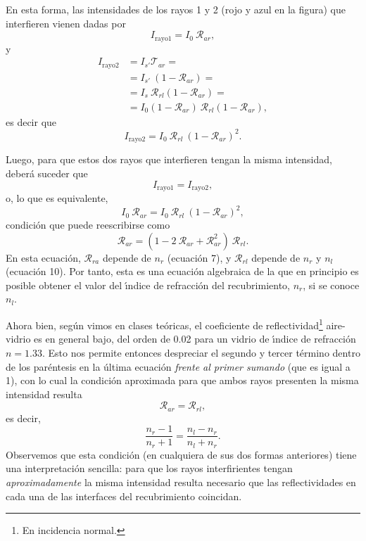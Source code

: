 \documentclass[a4paper]{article}
\begin{document}
En esta forma, las intensidades de los rayos 1 y 2 (rojo y azul en la
figura) que interfieren vienen dadas por
\begin{equation}
    I_\text{rayo1} = I_0 \: \mathcal{R}_{ar},
\end{equation}
y
\begin{align*}
    I_\text{rayo2} &= I_{s'} \mathcal{T}_{ar} = \\
                   &= I_{s'} \: \left(1 - \mathcal{R}_{ar}\right) = \\
                   &= I_s \: \mathcal{R}_{rl} \left(1 - \mathcal{R}_{ar}\right) =  \\
                   &= I_0 \left(1 - \mathcal{R}_{ar}\right) \: \mathcal{R}_{rl} 
\left(1 - \mathcal{R}_{ar}\right),
\end{align*}
es decir que
\begin{equation}
    I_\text{rayo2} = I_0 \: \mathcal{R}_{rl} \: 
    \left( 1 - \mathcal{R}_{ar}\right)^2.
\end{equation}

Luego, para que estos dos rayos que interfieren tengan la misma 
intensidad, deber\'a suceder que
\begin{equation}
    I_\text{rayo1} = I_\text{rayo2},
\end{equation}
o, lo que es equivalente,
\begin{equation*}
    I_0 \: \mathcal{R}_{ar} = I_0 \: \mathcal{R}_{rl} \: \left(
    1 - \mathcal{R}_{ar}        \right)^2,
\end{equation*}
condici\'on que puede reescribirse como
\begin{equation}
    \mathcal{R}_{ar} = \left(1- 2\: \mathcal{R}_{ar} +
    \mathcal{R}_{ar}^2 \right) \: \mathcal{R}_{rl}.
\end{equation}
En esta ecuaci\'on, $\mathcal{R}_{ra}$ depende de $n_r$ (ecuaci\'on
7), y
$\mathcal{R}_{rl}$ depende de $n_r$ y $n_l$ (ecuaci\'on 10). Por tanto,
esta es una ecuaci\'on algebraica de la que en principio es
posible obtener el valor del \'\i ndice de refracci\'on
del recubrimiento, $n_r$, si se conoce $n_l$. 

Ahora bien, seg\'un vimos en clases te\'oricas, el coeficiente de 
reflectividad\footnote{En incidencia normal.} aire-vidrio es en general bajo, del orden de 0.02 para
un vidrio de \'\i ndice de refracci\'on $n = 1.33$. Esto nos permite
entonces despreciar el segundo y tercer t\'ermino dentro de los 
par\'entesis en la \'ultima ecuaci\'on {\it frente al primer sumando} (que
es igual
a 1), con lo cual la condici\'on
aproximada para que ambos rayos presenten la misma intensidad resulta
\begin{equation*}
    \mathcal{R}_{ar} = \mathcal{R}_{rl},
\end{equation*}
es decir,
\begin{equation}
    \frac{n_r - 1}{n_r + 1} = \frac{n_l - n_r}{n_l + n_r}.
\end{equation}
Observemos que esta condici\'on (en cualquiera de sus dos formas
anteriores) tiene una interpretaci\'on sencilla: para que los rayos
interfirientes tengan {\it aproximadamente} la misma intensidad
resulta necesario que las reflectividades en cada una de las interfaces
del recubrimiento coincidan. 
\end{document}
